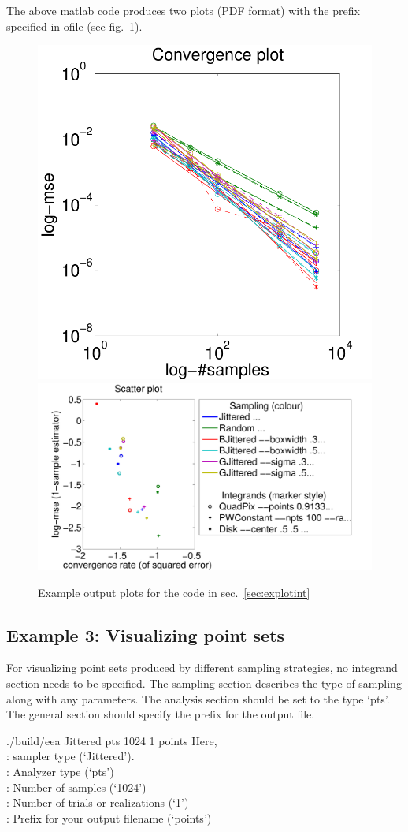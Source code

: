 The above matlab code produces two plots (PDF format) with the prefix specified in ofile (see fig.~\ref{fig:explotint}). 
\begin{figure}[htbp]
\includegraphics[width=0.36\linewidth]{figs/test-convs.pdf} 
\includegraphics[width=0.64\linewidth]{figs/test-scatter.pdf}
\caption{\label{fig:explotint} Example output plots for the code in sec.~\ref{sec:explotint}}
\end{figure}


\subsection{Example 3: Visualizing point sets}
For visualizing point sets produced by different sampling strategies, no integrand section needs to be specified. The sampling section describes the type of sampling along with any parameters. The analysis section should be set to the type `pts'. The general section should specify the prefix for the output file. 
%
\begin{tcolorbox}
./build/eea   Jittered   pts  1024  1   points
\tcblower
Here, \\
: sampler type (`Jittered'). \\
:  Analyzer type (`pts') \\
: Number of samples (`1024') \\
: Number of trials or realizations (`1') \\
: Prefix for your output filename (`points')
\end{tcolorbox}

